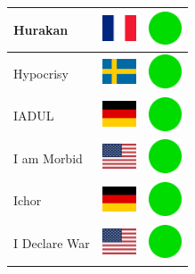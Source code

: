 \documentclass[12pt, a4paper, twoside]{report}
\begin{document}
\begin{center}
\begin{longtable}{|p{5cm}|p{2cm}|p{2cm}|}
 Hurakan                                                    & \includegraphics[width=1cm]{../img/flags/fr} &   \includegraphics[width=1cm]{../likes/y} \\ \hline
 Hypocrisy                                                  & \includegraphics[width=1cm]{../img/flags/se} &   \includegraphics[width=1cm]{../likes/y} \\ \hline
 IADUL                                                      & \includegraphics[width=1cm]{../img/flags/de} &   \includegraphics[width=1cm]{../likes/y} \\ \hline
 I am Morbid                                                & \includegraphics[width=1cm]{../img/flags/us} &   \includegraphics[width=1cm]{../likes/y} \\ \hline
 Ichor                                                      & \includegraphics[width=1cm]{../img/flags/de} &   \includegraphics[width=1cm]{../likes/y} \\ \hline
 I Declare War                                              & \includegraphics[width=1cm]{../img/flags/us} &   \includegraphics[width=1cm]{../likes/y} \\ \hline

\end{longtable}
\end{center}
\end{document}
